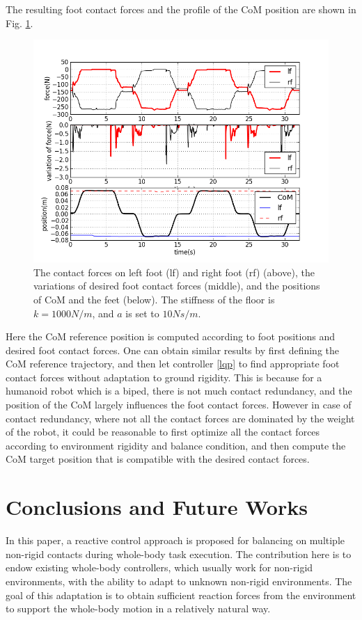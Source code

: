 \documentclass[letterpaper, 10 pt, conference]{ieeeconf}  %
\begin{document}
The resulting foot contact forces and the profile of the CoM position are shown in Fig. \ref{walking_result}.
\begin{figure}[!t]
\centering
\includegraphics[width=\linewidth]{../figure/walking_force.png}
\caption{The contact forces on left foot (lf) and right foot (rf) (above), the variations of desired foot contact forces (middle), and the positions of CoM and the feet (below). The stiffness of the floor is $k=1000 N/m$, and $a$ is set to $10 Ns/m$.}
\label{walking_result}
\end{figure}
Here the CoM reference position is computed according to foot positions and desired foot contact forces.
One can obtain similar results by first defining the CoM reference trajectory, and then let controller \eqref{lqp} to find appropriate foot contact forces without adaptation to ground rigidity. This is because for a humanoid robot which is a biped, there is not much contact redundancy, and the position of the CoM largely influences the foot contact forces. However in case of contact redundancy, where not all the contact forces are dominated by the weight of the robot, it could be reasonable to first optimize all the contact forces according to environment rigidity and balance condition, and then compute the CoM target position that is compatible with the desired contact forces. 

\section{Conclusions and Future Works}
\label{Section:Conclusions}
In this paper, a reactive control approach is proposed for balancing on multiple non-rigid contacts during whole-body task execution. The contribution here is to endow existing whole-body controllers, which usually work for non-rigid environments, with the ability to adapt to unknown non-rigid environments. The goal of this adaptation is to obtain sufficient reaction forces from the environment to support the whole-body motion in a relatively natural way.
\end{document}
